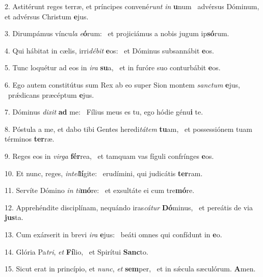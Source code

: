2. Astitérunt reges terræ, et príncipes convené\textit{runt} \textit{in} \textbf{u}num \ast\  advérsus Dóminum, et advérsus Christum \textbf{e}jus.\

3. Dirumpámus víncu\textit{la} \textit{e}\textbf{ó}rum: \ast\  et projiciámus a nobis jugum ip\textbf{só}rum.\

4. Qui hábitat in cælis, irri\textit{dé}\textit{bit} \textbf{e}os: \ast\  et Dóminus subsannábit \textbf{e}os.\

5. Tunc loquétur ad eos in \textit{i}\textit{ra} \textbf{su}a, \ast\  et in furóre suo conturbábit \textbf{e}os.\

6. Ego autem constitútus sum Rex ab eo super Sion montem \textit{sanc}\textit{tum} \textbf{e}jus, \ast\  prǽdicans præcéptum \textbf{e}jus.\

7. Dóminus \textit{di}\textit{xit} \textbf{ad} me: \ast\  Fílius meus es tu, ego hódie génu\textbf{i} te.\

8. Póstula a me, et dabo tibi Gentes heredi\textit{tá}\textit{tem} \textbf{tu}am, \ast\  et possessiónem tuam términos \textbf{ter}ræ.\

9. Reges eos in \textit{vir}\textit{ga} \textbf{fér}rea, \ast\  et tamquam vas fíguli confrínges \textbf{e}os.\

10. Et nunc, reges, \textit{in}\textit{tel}\textbf{lí}gite: \ast\  erudímini, qui judicátis \textbf{ter}ram.\

11. Servíte Dómino \textit{in} \textit{ti}\textbf{mó}re: \ast\  et exsultáte ei cum tre\textbf{mó}re.\

12. Apprehéndite disciplínam, nequándo iras\textit{cá}\textit{tur} \textbf{Dó}minus, \ast\  et pereátis de via \textbf{jus}ta.\

13. Cum exárserit in brevi \textit{i}\textit{ra} \textbf{e}jus: \ast\  beáti omnes qui confídunt in \textbf{e}o.\

14. Glória Pa\textit{tri}, \textit{et} \textbf{Fí}lio, \ast\  et Spirítui \textbf{Sanc}to.\

15. Sicut erat in princípio, et \textit{nunc}, \textit{et} \textbf{sem}per, \ast\  et in sǽcula sæculórum. \textbf{A}men.\

